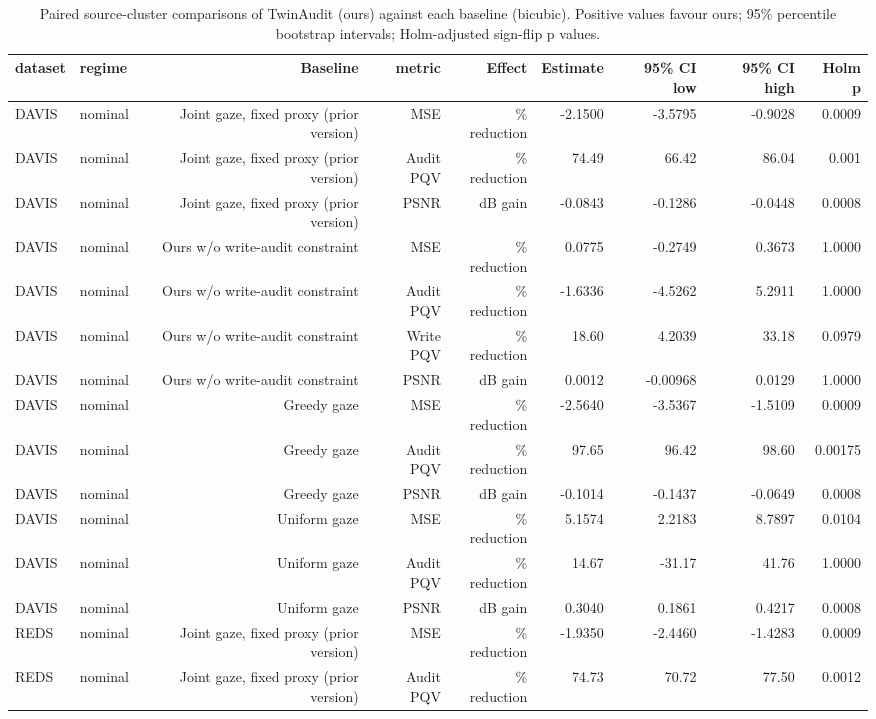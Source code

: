 \begin{table}[t]
\centering
\caption{Paired source-cluster comparisons of TwinAudit (ours) against each baseline (bicubic). Positive values favour ours; 95\% percentile bootstrap intervals; Holm-adjusted sign-flip p values.}
\label{tab:paired_bicubic}
\small
\begin{tabular}{llrrrrrrr}
\toprule
dataset & regime & Baseline & metric & Effect & Estimate & 95\% CI low & 95\% CI high & Holm p \\
\midrule
DAVIS & nominal & Joint gaze, fixed proxy (prior version) & MSE & \% reduction & -2.1500 & -3.5795 & -0.9028 & 0.0009 \\
DAVIS & nominal & Joint gaze, fixed proxy (prior version) & Audit PQV & \% reduction & 74.49 & 66.42 & 86.04 & 0.001 \\
DAVIS & nominal & Joint gaze, fixed proxy (prior version) & PSNR & dB gain & -0.0843 & -0.1286 & -0.0448 & 0.0008 \\
DAVIS & nominal & Ours w/o write-audit constraint & MSE & \% reduction & 0.0775 & -0.2749 & 0.3673 & 1.0000 \\
DAVIS & nominal & Ours w/o write-audit constraint & Audit PQV & \% reduction & -1.6336 & -4.5262 & 5.2911 & 1.0000 \\
DAVIS & nominal & Ours w/o write-audit constraint & Write PQV & \% reduction & 18.60 & 4.2039 & 33.18 & 0.0979 \\
DAVIS & nominal & Ours w/o write-audit constraint & PSNR & dB gain & 0.0012 & -0.00968 & 0.0129 & 1.0000 \\
DAVIS & nominal & Greedy gaze & MSE & \% reduction & -2.5640 & -3.5367 & -1.5109 & 0.0009 \\
DAVIS & nominal & Greedy gaze & Audit PQV & \% reduction & 97.65 & 96.42 & 98.60 & 0.00175 \\
DAVIS & nominal & Greedy gaze & PSNR & dB gain & -0.1014 & -0.1437 & -0.0649 & 0.0008 \\
DAVIS & nominal & Uniform gaze & MSE & \% reduction & 5.1574 & 2.2183 & 8.7897 & 0.0104 \\
DAVIS & nominal & Uniform gaze & Audit PQV & \% reduction & 14.67 & -31.17 & 41.76 & 1.0000 \\
DAVIS & nominal & Uniform gaze & PSNR & dB gain & 0.3040 & 0.1861 & 0.4217 & 0.0008 \\
REDS & nominal & Joint gaze, fixed proxy (prior version) & MSE & \% reduction & -1.9350 & -2.4460 & -1.4283 & 0.0009 \\
REDS & nominal & Joint gaze, fixed proxy (prior version) & Audit PQV & \% reduction & 74.73 & 70.72 & 77.50 & 0.0012 \\

\end{tabular}
\end{table}
